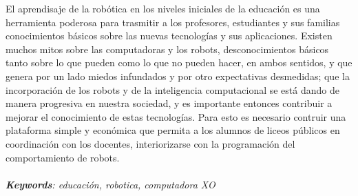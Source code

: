 El aprendisaje de la rob\'otica en los niveles iniciales de la educaci\'on es una herramienta poderosa para trasmitir a los profesores, estudiantes y sus familias conocimientos b\'asicos sobre las nuevas tecnolog\'ias y sus aplicaciones. 
Existen muchos mitos sobre las computadoras y los robots, desconocimientos b\'asicos tanto sobre lo que pueden como lo que no pueden hacer, en ambos sentidos, y que genera por un lado miedos infundados y por otro expectativas desmedidas; que la incorporaci\'on de los robots y de la inteligencia computacional se est\'á dando de manera progresiva en nuestra sociedad, y es importante entonces contribuir a mejorar el conocimiento de estas tecnolog\'ias.
Para esto es necesario contruir una plataforma simple y econ\'omica que permita a los alumnos de liceos p\'ublicos en coordinaci\'on con los docentes, interiorizarse con la programaci\'on del comportamiento de robots.
\\
\\
\textit{\textbf{Keywords}: educaci\'on, robotica, computadora XO}
